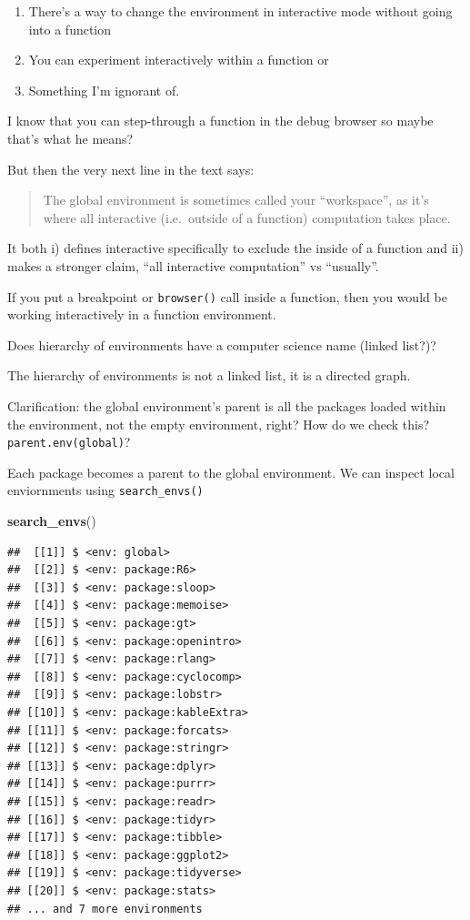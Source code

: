 \documentclass[]{book}
\newenvironment{Shaded}{\begin{snugshade}}{\end{snugshade}}
\newcommand{\KeywordTok}[1]{\textcolor[rgb]{0.13,0.29,0.53}{\textbf{#1}}}
\newcommand{\NormalTok}[1]{#1}
\providecommand{\tightlist}{%
  \setlength{\itemsep}{0pt}\setlength{\parskip}{0pt}}
\begin{document}
\begin{enumerate}
\def\labelenumi{\arabic{enumi}.}
\tightlist
\item
  There's a way to change the environment in interactive mode without going into a function
\item
  You can experiment interactively within a function or
\item
  Something I'm ignorant of.
\end{enumerate}

I know that you can step-through a function in the debug browser so maybe that's what he means?

But then the very next line in the text says:

\begin{quote}
The global environment is sometimes called your ``workspace'', as it's where all interactive (i.e.~outside of a function) computation takes place.
\end{quote}

It both i) defines interactive specifically to exclude the inside of a function and ii) makes a stronger claim, ``all interactive computation'' vs ``usually''.

If you put a breakpoint or \texttt{browser()} call inside a function, then you would be working interactively in a function environment.

Does hierarchy of environments have a computer science name (linked list?)?

The hierarchy of environments is not a linked list, it is a directed graph.

Clarification: the global environment's parent is all the packages loaded within the environment, not the empty environment, right? How do we check this? \texttt{parent.env(global)}?

Each package becomes a parent to the global environment. We can inspect local enviornments using \texttt{search\_envs()}

\begin{Shaded}
\begin{Highlighting}[]
\KeywordTok{search_envs}\NormalTok{()}
\end{Highlighting}
\end{Shaded}

\begin{verbatim}
##  [[1]] $ <env: global>
##  [[2]] $ <env: package:R6>
##  [[3]] $ <env: package:sloop>
##  [[4]] $ <env: package:memoise>
##  [[5]] $ <env: package:gt>
##  [[6]] $ <env: package:openintro>
##  [[7]] $ <env: package:rlang>
##  [[8]] $ <env: package:cyclocomp>
##  [[9]] $ <env: package:lobstr>
## [[10]] $ <env: package:kableExtra>
## [[11]] $ <env: package:forcats>
## [[12]] $ <env: package:stringr>
## [[13]] $ <env: package:dplyr>
## [[14]] $ <env: package:purrr>
## [[15]] $ <env: package:readr>
## [[16]] $ <env: package:tidyr>
## [[17]] $ <env: package:tibble>
## [[18]] $ <env: package:ggplot2>
## [[19]] $ <env: package:tidyverse>
## [[20]] $ <env: package:stats>
## ... and 7 more environments
\end{verbatim}
\end{document}
